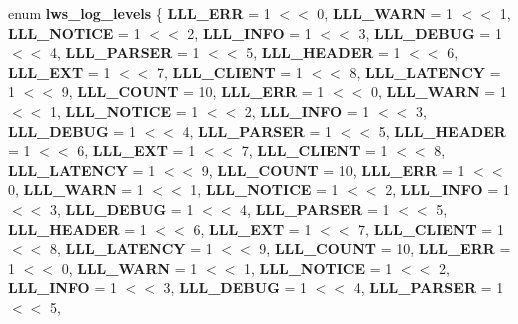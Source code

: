 \begin{DoxyCompactItemize}
enum {\bfseries lws\+\_\+log\+\_\+levels} \{ \newline
{\bfseries L\+L\+L\+\_\+\+E\+RR} = 1 $<$$<$ 0, 
{\bfseries L\+L\+L\+\_\+\+W\+A\+RN} = 1 $<$$<$ 1, 
{\bfseries L\+L\+L\+\_\+\+N\+O\+T\+I\+CE} = 1 $<$$<$ 2, 
{\bfseries L\+L\+L\+\_\+\+I\+N\+FO} = 1 $<$$<$ 3, 
\newline
{\bfseries L\+L\+L\+\_\+\+D\+E\+B\+UG} = 1 $<$$<$ 4, 
{\bfseries L\+L\+L\+\_\+\+P\+A\+R\+S\+ER} = 1 $<$$<$ 5, 
{\bfseries L\+L\+L\+\_\+\+H\+E\+A\+D\+ER} = 1 $<$$<$ 6, 
{\bfseries L\+L\+L\+\_\+\+E\+XT} = 1 $<$$<$ 7, 
\newline
{\bfseries L\+L\+L\+\_\+\+C\+L\+I\+E\+NT} = 1 $<$$<$ 8, 
{\bfseries L\+L\+L\+\_\+\+L\+A\+T\+E\+N\+CY} = 1 $<$$<$ 9, 
{\bfseries L\+L\+L\+\_\+\+C\+O\+U\+NT} = 10, 
{\bfseries L\+L\+L\+\_\+\+E\+RR} = 1 $<$$<$ 0, 
\newline
{\bfseries L\+L\+L\+\_\+\+W\+A\+RN} = 1 $<$$<$ 1, 
{\bfseries L\+L\+L\+\_\+\+N\+O\+T\+I\+CE} = 1 $<$$<$ 2, 
{\bfseries L\+L\+L\+\_\+\+I\+N\+FO} = 1 $<$$<$ 3, 
{\bfseries L\+L\+L\+\_\+\+D\+E\+B\+UG} = 1 $<$$<$ 4, 
\newline
{\bfseries L\+L\+L\+\_\+\+P\+A\+R\+S\+ER} = 1 $<$$<$ 5, 
{\bfseries L\+L\+L\+\_\+\+H\+E\+A\+D\+ER} = 1 $<$$<$ 6, 
{\bfseries L\+L\+L\+\_\+\+E\+XT} = 1 $<$$<$ 7, 
{\bfseries L\+L\+L\+\_\+\+C\+L\+I\+E\+NT} = 1 $<$$<$ 8, 
\newline
{\bfseries L\+L\+L\+\_\+\+L\+A\+T\+E\+N\+CY} = 1 $<$$<$ 9, 
{\bfseries L\+L\+L\+\_\+\+C\+O\+U\+NT} = 10, 
{\bfseries L\+L\+L\+\_\+\+E\+RR} = 1 $<$$<$ 0, 
{\bfseries L\+L\+L\+\_\+\+W\+A\+RN} = 1 $<$$<$ 1, 
\newline
{\bfseries L\+L\+L\+\_\+\+N\+O\+T\+I\+CE} = 1 $<$$<$ 2, 
{\bfseries L\+L\+L\+\_\+\+I\+N\+FO} = 1 $<$$<$ 3, 
{\bfseries L\+L\+L\+\_\+\+D\+E\+B\+UG} = 1 $<$$<$ 4, 
{\bfseries L\+L\+L\+\_\+\+P\+A\+R\+S\+ER} = 1 $<$$<$ 5, 
\newline
{\bfseries L\+L\+L\+\_\+\+H\+E\+A\+D\+ER} = 1 $<$$<$ 6, 
{\bfseries L\+L\+L\+\_\+\+E\+XT} = 1 $<$$<$ 7, 
{\bfseries L\+L\+L\+\_\+\+C\+L\+I\+E\+NT} = 1 $<$$<$ 8, 
{\bfseries L\+L\+L\+\_\+\+L\+A\+T\+E\+N\+CY} = 1 $<$$<$ 9, 
\newline
{\bfseries L\+L\+L\+\_\+\+C\+O\+U\+NT} = 10, 
{\bfseries L\+L\+L\+\_\+\+E\+RR} = 1 $<$$<$ 0, 
{\bfseries L\+L\+L\+\_\+\+W\+A\+RN} = 1 $<$$<$ 1, 
{\bfseries L\+L\+L\+\_\+\+N\+O\+T\+I\+CE} = 1 $<$$<$ 2, 
\newline
{\bfseries L\+L\+L\+\_\+\+I\+N\+FO} = 1 $<$$<$ 3, 
{\bfseries L\+L\+L\+\_\+\+D\+E\+B\+UG} = 1 $<$$<$ 4, 
{\bfseries L\+L\+L\+\_\+\+P\+A\+R\+S\+ER} = 1 $<$$<$ 5, 

\end{DoxyCompactItemize}
